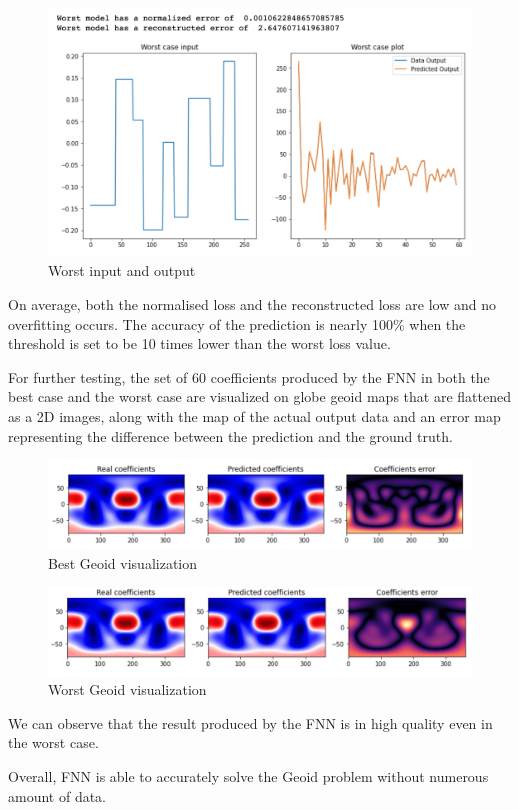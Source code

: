 \begin{figure}[H]
    \caption{Worst input and output}
    \includegraphics[scale=0.6]{figures/geoid_images/Geoid_Worst.png}
\end{figure}

On average, both the normalised loss and the reconstructed loss are low and no overfitting occurs. The accuracy of the prediction is nearly 100\% when the threshold is set to be 10 times lower than the worst loss value. 

For further testing, the set of 60 coefficients produced by the FNN in both the best case and the worst case are visualized on globe geoid maps that are flattened as a 2D images, along with the map of the actual output data and an error map representing the difference between the prediction and the ground truth.

\begin{figure}[H]
    \caption{Best Geoid visualization}
    \includegraphics[scale=0.6]{figures/geoid_images/Geoid_Best_visualization.png}
\end{figure}

\begin{figure}[H]
    \caption{Worst Geoid visualization}
    \includegraphics[scale=0.6]{figures/geoid_images/Geoid_Worst_visualization.png}
\end{figure}

We can observe that the result produced by the FNN is in high quality even in the worst case.

Overall, FNN is able to accurately solve the Geoid problem without numerous amount of data.


